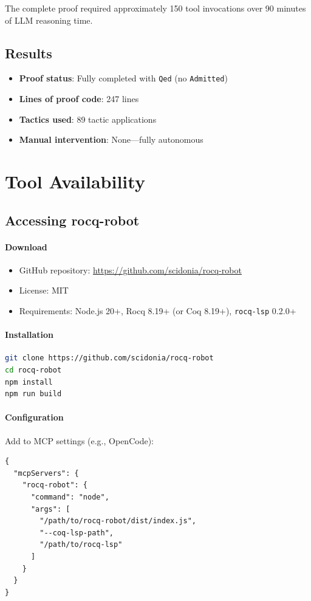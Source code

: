 \documentclass[sigconf,screen,nonacm]{acmart}
\begin{document}
The complete proof required approximately 150 tool invocations over 90 minutes of LLM reasoning time.

\subsection{Results}

\begin{itemize}
\item \textbf{Proof status}: Fully completed with \texttt{Qed} (no \texttt{Admitted})
\item \textbf{Lines of proof code}: 247 lines
\item \textbf{Tactics used}: 89 tactic applications
\item \textbf{Manual intervention}: None—fully autonomous
\end{itemize}

\section{Tool Availability}

\subsection{Accessing rocq-robot}

\paragraph{Download}
\begin{itemize}
\item GitHub repository: \url{https://github.com/scidonia/rocq-robot}
\item License: MIT
\item Requirements: Node.js 20+, Rocq 8.19+ (or Coq 8.19+), \texttt{rocq-lsp} 0.2.0+
\end{itemize}

\paragraph{Installation}
\begin{lstlisting}[language=bash,basicstyle=\footnotesize\ttfamily]
git clone https://github.com/scidonia/rocq-robot
cd rocq-robot
npm install
npm run build
\end{lstlisting}

\paragraph{Configuration}
Add to MCP settings (e.g., OpenCode):
\begin{lstlisting}[basicstyle=\footnotesize\ttfamily]
{
  "mcpServers": {
    "rocq-robot": {
      "command": "node",
      "args": [
        "/path/to/rocq-robot/dist/index.js",
        "--coq-lsp-path",
        "/path/to/rocq-lsp"
      ]
    }
  }
}
\end{lstlisting}
\end{document}
